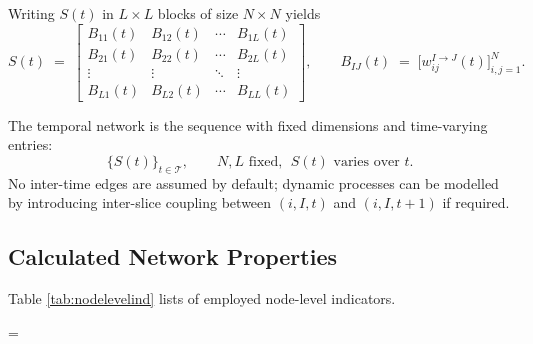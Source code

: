 \documentclass[preprint, 3p,
authoryear]{elsarticle} %
\begin{document}
\noindent Writing \(S(t)\) in \(L\times L\) blocks of size \(N\times N\)
yields \begin{equation}
S(t) \;=\;
\begin{bmatrix}
B_{11}(t) & B_{12}(t) & \cdots & B_{1L}(t)\\
B_{21}(t) & B_{22}(t) & \cdots & B_{2L}(t)\\
\vdots    & \vdots    & \ddots & \vdots   \\
B_{L1}(t) & B_{L2}(t) & \cdots & B_{LL}(t)
\end{bmatrix},
\qquad
B_{I J}(t) \;=\; \big[w_{ij}^{I\to J}(t)\big]_{i,j=1}^N.
\label{eq:block-structure}
\end{equation}

The temporal network is the sequence with fixed dimensions and
time-varying entries: \begin{equation}
\big\{ S(t) \big\}_{t\in\mathcal{T}}, \qquad N,L \text{ fixed}, \ \ S(t) \text{ varies over } t.
\label{eq:temporal-sequence}
\end{equation} No inter-time edges are assumed by default; dynamic
processes can be modelled by introducing inter-slice coupling between
\((i,I,t)\) and \((i,I,t+1)\) if required.

\subsection{Calculated Network Properties}\label{sec:calcnet}

Table \ref{tab:nodelevelind} lists of employed node-level indicators.

\LTcapwidth=\linewidth
\end{document}

